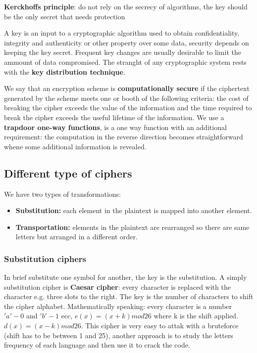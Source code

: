     \textbf{Kerckhoffs principle}: do not rely on the secrecy of algorithms, the key should be the only secret that needs protection
    
    A key is an input to a cryptographic algorithm used to obtain confidentiality, integrity and authenticity or other property over some data, security depends on keeping the key secret. Frequent key changes are usually desirable to limit the ammount of data compromised. The stranght of any cryptographic system rests with the \textbf{key distribution technique}.
    
    We say that an encryption scheme is \textbf{computationally secure} if the ciphertext generated by the scheme meets one or booth of the following criteria: the cost of breaking the cipher exceeds the value of the information and the time required to break the cipher exceeds the useful lifetime of the information. We use a \textbf{trapdoor one-way functions}, is a one way function with an additional requirement: the computation in the reverse direction becomes straightforward whene some additional information is revealed.
    
    \subsection{Different type of ciphers}
    We have two types of transformations:
    \begin{itemize}
        \item \textbf{Substitution:} each element in the plaintext is mapped into another element.
        \item \textbf{Transportation:} elements in the plaintext are rearranged so there are same letters but arranged in a different order.
    \end{itemize}
    
    \subsubsection{Substitution ciphers}
    In brief substitute one symbol for another, the key is the substitution. A simply substitution cipher is \textbf{Caesar cipher}: every character is replaced with the character e.g. three slots to the right. The key is the number of characters to shift the cipher alphabet. Mathematically speaking: every character is a number $'a' - 0$ and  $ 'b' - 1$ ecc, $e(x) =(x+k) mod 26$ where k is the shift applied. $d(x)=(x-k) mod 26$. This cipher is very easy to attak with a bruteforce (shift has to be between 1 and 25), another approach is to study the letters frequency of each language and then use it to crack the code.
    

